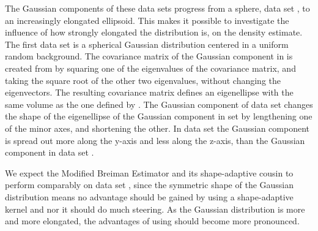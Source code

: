 The Gaussian components of these data sets progress from a sphere, \ie data set \ferdosiOne, to an increasingly elongated ellipsoid. This makes it possible to investigate the influence of how strongly elongated the distribution is, on the density estimate. 
	The first data set is a spherical Gaussian distribution centered in a uniform random background. 
	The covariance matrix of the Gaussian component in \baakmanOne is created from \ferdosiOne by squaring one of the eigenvalues of the covariance matrix, and taking the square root of the other two eigenvalues, without changing the eigenvectors. The resulting covariance matrix defines an eigenellipse with the same volume as the one defined by \ferdosiOne.
	The Gaussian component of data set \baakmanFour changes the shape of the eigenellipse of the Gaussian component in set \ferdosiOne by lengthening one of the minor axes, and shortening the other.
	In data set \baakmanFive the Gaussian component is spread out more along the y-axis and less along the z-axis, than the Gaussian component in data set \baakmanFour.

	We expect the Modified Breiman Estimator and its shape-adaptive cousin to perform comparably on data set \ferdosiOne, since the symmetric shape of the Gaussian distribution means no advantage should be gained by using a shape-adaptive kernel and nor it should do much steering. 
	As the Gaussian distribution is more and more elongated, the advantages of using \sambe should become more pronounced. 